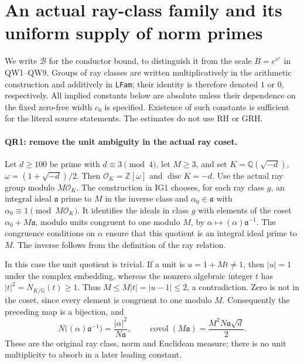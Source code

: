 \section{An actual ray-class family and its uniform supply of norm primes}
\label{sec:ray-prime-estimates}


We write $\mathcal B$ for the conductor bound, to distinguish it from
the scale $B=e^{x^\epsilon}$ in QW1--QW9. Groups of ray classes are
written multiplicatively in the arithmetic construction and additively
in \texttt{LFam}; their identity is therefore denoted $1$ or $0$,
respectively. All implied constants below are absolute unless their
dependence on the fixed zero-free width $c_0$ is specified. Existence
of such constants is sufficient for the literal source statements.
The estimates do not use RH or GRH.

\paragraph{QR1: remove the unit ambiguity in the actual ray coset.}
Let $d\ge100$ be prime with $d\equiv3\pmod4$, let $M\ge3$, and set
$K=\mathbb Q(\sqrt{-d})$, $\omega=(1+\sqrt{-d})/2$.
Then $\mathcal O_K=\mathbb Z[\omega]$ and $\operatorname{disc}K=-d$.
Use the actual ray group modulo $M\mathcal O_K$. The construction in
IG1 chooses, for each ray class $g$, an integral ideal $\mathfrak a$
prime to $M$ in the inverse class and $\alpha_0\in\mathfrak a$ with
$\alpha_0\equiv1\pmod {M\mathcal O_K}$. It identifies the ideals in
class $g$ with elements of the coset
$\alpha_0+M\mathfrak a$, modulo units congruent to one modulo $M$,
by $\alpha\mapsto(\alpha)\mathfrak a^{-1}$. The congruence conditions
on $\alpha$ ensure that this quotient is an integral ideal prime to
$M$. The inverse follows from the definition of the ray relation.

In this case the unit quotient is trivial. If a unit is
$u=1+Mt\ne1$, then $|u|=1$ under the complex embedding, whereas the
nonzero algebraic integer $t$ has $|t|^2=N_{K/\mathbb Q}(t)\ge1$.
Thus $M\le M|t|=|u-1|\le2$, a contradiction. Zero is not in the
coset, since every element is congruent to one modulo $M$.
Consequently the preceding map is a bijection, and
\[
 N\big((\alpha)\mathfrak a^{-1}\big)
       =\frac{|\alpha|^2}{N\mathfrak a},\qquad
 \operatorname{covol}(M\mathfrak a)
       =\frac{M^2N\mathfrak a\sqrt d}{2}.                 \tag{QR.1}
\]
These are the original ray class, norm and Euclidean measure; there is
no unit multiplicity to absorb in a later leading constant.

